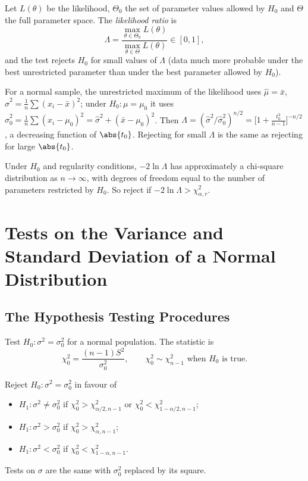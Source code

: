 \begin{definition}
Let $L(\theta)$ be the likelihood, $\Theta_0$ the set of parameter values allowed by $H_0$ and $\Theta$ the full parameter space. The \emph{likelihood ratio} is
\[ \Lambda=\frac{\max_{\theta\in\Theta_0}L(\theta)}{\max_{\theta\in\Theta}L(\theta)}\in[0,1], \]
and the test rejects $H_0$ for small values of $\Lambda$ (data much more probable under the best unrestricted parameter than under the best parameter allowed by $H_0$).
\end{definition}

\begin{example}
For a normal sample, the unrestricted maximum of the likelihood uses $\hat\mu=\bar{x}$, $\hat\sigma^2=\frac1n\sum(x_i-\bar{x})^2$; under $H_0:\mu=\mu_0$ it uses $\hat\sigma_0^2=\frac1n\sum(x_i-\mu_0)^2=\hat\sigma^2+(\bar{x}-\mu_0)^2$. Then $\Lambda=(\hat\sigma^2/\hat\sigma_0^2)^{n/2}=\big[1+\tfrac{t_0^2}{n-1}\big]^{-n/2}$, a decreasing function of $\abs{t_0}$. Rejecting for small $\Lambda$ is the same as rejecting for large $\abs{t_0}$.
\end{example}

\begin{theorem}\label{thm:wilks}
Under $H_0$ and regularity conditions, $-2\ln\Lambda$ has approximately a chi-square distribution as $n\to\infty$, with degrees of freedom equal to the number of parameters restricted by $H_0$. So reject if $-2\ln\Lambda>\chi^2_{\alpha,r}$.
\end{theorem}

\section{Tests on the Variance and Standard Deviation of a Normal Distribution}

\subsection{The Hypothesis Testing Procedures}

Test $H_0:\sigma^2=\sigma_0^2$ for a normal population. The statistic is
\[ \chi_0^2=\frac{(n-1)S^2}{\sigma_0^2},\qquad\chi_0^2\sim\chi^2_{n-1}\text{ when }H_0\text{ is true.} \]

\begin{theorem}\label{thm:chisqtest}
Reject $H_0:\sigma^2=\sigma_0^2$ in favour of
\begin{itemize}
  \item $H_1:\sigma^2\ne\sigma_0^2$ if $\chi_0^2>\chi^2_{\alpha/2,n-1}$ or $\chi_0^2<\chi^2_{1-\alpha/2,n-1}$;
  \item $H_1:\sigma^2>\sigma_0^2$ if $\chi_0^2>\chi^2_{\alpha,n-1}$;
  \item $H_1:\sigma^2<\sigma_0^2$ if $\chi_0^2<\chi^2_{1-\alpha,n-1}$.
\end{itemize}
Tests on $\sigma$ are the same with $\sigma_0^2$ replaced by its square.
\end{theorem}

